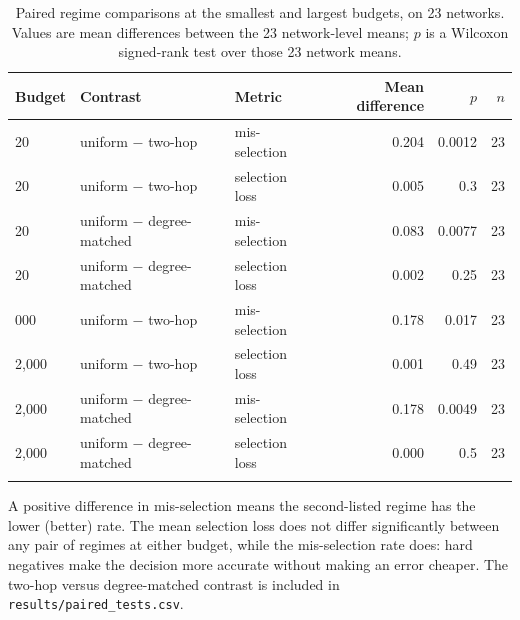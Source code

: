 \begin{table}[htbp]
\centering
\footnotesize
\caption{Paired regime comparisons at the smallest and largest budgets, on 23 networks.
Values are mean differences between the 23 network-level means; $p$ is a Wilcoxon
signed-rank test over those 23 network means.}
\label{tab:paired}
\begin{tabular}{lllrrr}
\toprule
Budget & Contrast & Metric & Mean difference & $p$ & $n$ \\
\midrule
20 & uniform $-$ two-hop & mis-selection & 0.204 & 0.0012 & 23 \\
20 & uniform $-$ two-hop & selection loss & 0.005 & 0.3 & 23 \\
20 & uniform $-$ degree-matched & mis-selection & 0.083 & 0.0077 & 23 \\
20 & uniform $-$ degree-matched & selection loss & 0.002 & 0.25 & 23 \\
\addlinespace[2pt]
2{,}000 & uniform $-$ two-hop & mis-selection & 0.178 & 0.017 & 23 \\
2{,}000 & uniform $-$ two-hop & selection loss & 0.001 & 0.49 & 23 \\
2{,}000 & uniform $-$ degree-matched & mis-selection & 0.178 & 0.0049 & 23 \\
2{,}000 & uniform $-$ degree-matched & selection loss & 0.000 & 0.5 & 23 \\
\addlinespace[2pt]
\bottomrule
\end{tabular}
\par\vspace{2pt}\begin{minipage}{\linewidth}\footnotesize A positive difference in
mis-selection means the second-listed regime has the lower (better) rate. The mean
selection loss does not differ significantly between any pair of regimes at either
budget, while the mis-selection rate does: hard negatives make the decision more
accurate without making an error cheaper. The two-hop versus degree-matched contrast is
included in \texttt{results/paired\_tests.csv}.\end{minipage}
\end{table}

